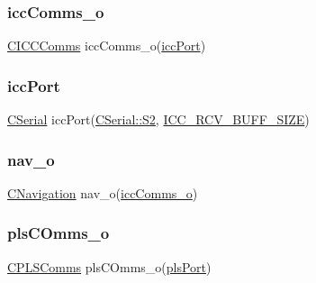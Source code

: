 \mbox{\label{_a_d_a_s___nav_u_8ino_a62ef6b3308259edb69af585549178324}} 
\subsubsection{\texorpdfstring{iccComms\_o}{iccComms\_o}}
{\footnotesize\ttfamily \mbox{\hyperlink{class_c_i_c_c_comms}{C\+I\+C\+C\+Comms}} icc\+Comms\+\_\+o(\mbox{\hyperlink{_a_d_a_s___nav_u_8ino_ad1e6d9fed4369104e412a46c019634d2}{icc\+Port}})}

\mbox{\label{_a_d_a_s___nav_u_8ino_ad1e6d9fed4369104e412a46c019634d2}} 
\subsubsection{\texorpdfstring{iccPort}{iccPort}}
{\footnotesize\ttfamily \mbox{\hyperlink{class_c_serial}{C\+Serial}} icc\+Port(\mbox{\hyperlink{class_c_serial_a000039540cc90b18bafacf5744e7eda2a8cc95f4591147b0df028e003f82220a1}{C\+Serial\+::\+S2}}, \mbox{\hyperlink{_a_d_a_s___cfg_8h_abf41bed56ee0b2a8858687c4420bb110}{I\+C\+C\+\_\+\+R\+C\+V\+\_\+\+B\+U\+F\+F\+\_\+\+S\+I\+ZE}})}

\mbox{\label{_a_d_a_s___nav_u_8ino_a8abc3c3b0c6950fd83525420d5ca0dd2}} 
\subsubsection{\texorpdfstring{nav\_o}{nav\_o}}
{\footnotesize\ttfamily \mbox{\hyperlink{class_c_navigation}{C\+Navigation}} nav\+\_\+o(\mbox{\hyperlink{_a_d_a_s___nav_u_8ino_a62ef6b3308259edb69af585549178324}{icc\+Comms\+\_\+o}})}

\mbox{\label{_a_d_a_s___nav_u_8ino_add0df3806d74ba741b1d6bc5452d7e79}} 
\subsubsection{\texorpdfstring{plsCOmms\_o}{plsCOmms\_o}}
{\footnotesize\ttfamily \mbox{\hyperlink{class_c_p_l_s_comms}{C\+P\+L\+S\+Comms}} pls\+C\+Omms\+\_\+o(\mbox{\hyperlink{_a_d_a_s___nav_u_8ino_a5427ed2b254fc7bb97bb9c8b92af7d60}{pls\+Port}})}


